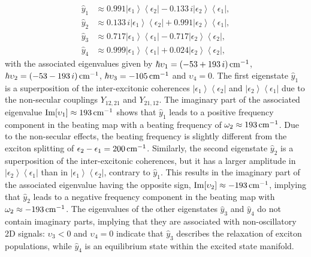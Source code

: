 \documentclass[%
 reprint,%
 amssymb, amsmath,%
 aip,cha,%
]{revtex4-1}
\newcommand{\bra}[1]{\ensuremath{\left\langle{#1}\right\vert}}
\newcommand{\ket}[1]{\ensuremath{\left|{#1}\right\rangle}}
\begin{document}
\begin{align}
\hat{y}_1&\approx 0.991\ket{\epsilon_1}\bra{\epsilon_2}-0.133\,i \ket{\epsilon_2}\bra{\epsilon_1},\label{eq:y1_homo}\\
\hat{y}_2&\approx 0.133\,i\ket{\epsilon_1}\bra{\epsilon_2}+0.991\ket{\epsilon_2}\bra{\epsilon_1},\label{eq:y2_homo}\\
\hat{y}_3&\approx 0.717\ket{\epsilon_1}\bra{\epsilon_1} - 0.717\ket{\epsilon_2}\bra{\epsilon_2},\\
\hat{y}_4&\approx 0.999\ket{\epsilon_1}\bra{\epsilon_1} + 0.024\ket{\epsilon_2}\bra{\epsilon_2},
\end{align}
with the associated eigenvalues given by $\hbar\upsilon_1=(-53+193\,i)\,{\rm cm}^{-1}$, $\hbar\upsilon_2=(-53-193\,i)\,{\rm cm}^{-1}$, $\hbar\upsilon_3=-105\,{\rm cm}^{-1}$ and $\upsilon_4=0$. The first eigenstate $\hat{y}_1$ is a superposition of the inter-excitonic coherences $\ket{\epsilon_1}\bra{\epsilon_2}$ and $\ket{\epsilon_2}\bra{\epsilon_1}$ due to the non-secular couplings $Y_{12,21}$ and $Y_{21,12}$. The imaginary part of the associated eigenvalue ${\rm Im}[\upsilon_1]\approx 193\,{\rm cm}^{-1}$ shows that $\hat{y}_1$ leads to a positive frequency component in the beating map with a beating frequency of $\omega_2\approx 193\,{\rm cm}^{-1}$. Due to the non-secular effects, the beating frequency is slightly different from the exciton splitting of $\epsilon_2-\epsilon_1=200\,{\rm cm}^{-1}$. Similarly, the second eigenstate $\hat{y}_2$ is a superposition of the inter-excitonic coherences, but it has a larger amplitude in $\ket{\epsilon_2}\bra{\epsilon_1}$ than in $\ket{\epsilon_1}\bra{\epsilon_2}$, contrary to $\hat{y}_1$. This results in the imaginary part of the associated eigenvalue having the opposite sign, ${\rm Im}[\upsilon_2]\approx -193\,{\rm cm}^{-1}$, implying that $\hat{y}_2$ leads to a negative frequency component in the beating map with $\omega_2\approx -193\,{\rm cm}^{-1}$. The eigenvalues of the other eigenstates $\hat{y}_{3}$ and $\hat{y}_{4}$ do not contain imaginary parts, implying that they are associated with non-oscillatory 2D signals: $\upsilon_3<0$ and $\upsilon_4=0$ indicate that $\hat{y}_{3}$ describes the relaxation of exciton populations, while $\hat{y}_{4}$ is an equilibrium state within the excited state manifold.
\end{document}
